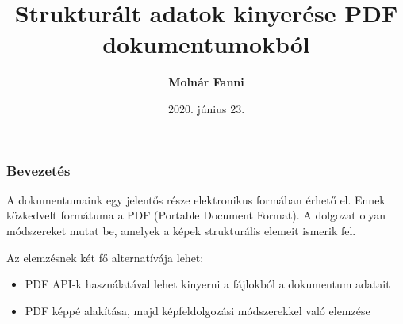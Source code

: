 \documentclass{beamer}
\begin{document}

\title[Strukturált adatok kinyerése PDF dokumentumokból]{Strukturált adatok kinyerése PDF dokumentumokból}
\author[Molnár Fanni]{\textbf{Molnár Fanni}}
\date{2020. június 23.}

\frame{\titlepage}

\begin{frame}[fragile]
\frametitle{Bevezetés}

A dokumentumaink egy jelentős része elektronikus formában érhető el. Ennek közkedvelt formátuma a PDF (Portable Document Format).
A dolgozat olyan módszereket mutat be, amelyek a képek strukturális elemeit ismerik fel.

\smallskip

Az elemzésnek két fő alternatívája lehet:

\bigskip

\begin{itemize}
    \item PDF API-k használatával lehet kinyerni a fájlokból a dokumentum adatait
    \item PDF képpé alakítása, majd képfeldolgozási módszerekkel való elemzése
\end{itemize}

\end{frame}
\end{document}
